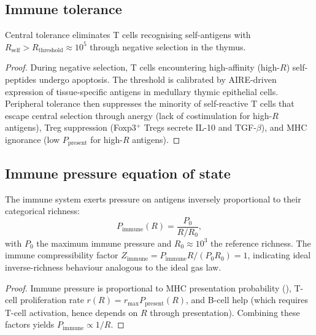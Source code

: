 \subsection{Immune tolerance}

\begin{theorem}
\label{thm:ch07-central-tolerance}
Central tolerance eliminates T cells recognising self-antigens with
$R_{\mathrm{self}} > R_{\mathrm{threshold}} \approx 10^5$ through negative
selection in the thymus.
\end{theorem}

\begin{proof}
During negative selection, T cells encountering high-affinity (high-$R$)
self-peptides undergo apoptosis.  The threshold is calibrated by AIRE-driven
expression of tissue-specific antigens in medullary thymic epithelial cells.
Peripheral tolerance then suppresses the minority of self-reactive T cells
that escape central selection through anergy (lack of costimulation for
high-$R$ antigens), Treg suppression (Foxp3$^+$ Tregs secrete IL-10 and
TGF-$\beta$), and MHC ignorance (low $P_{\mathrm{present}}$ for high-$R$
antigens).
\end{proof}

\subsection{Immune pressure equation of state}

\begin{theorem}
\label{thm:ch07-immune-pressure}
The immune system exerts pressure on antigens inversely proportional to their
categorical richness:
\begin{equation}
  P_{\mathrm{immune}}(R) = \frac{P_0}{R/R_0},
  \label{eq:ch07-immune-pressure}
\end{equation}
with $P_0$ the maximum immune pressure and $R_0 \approx 10^3$ the reference
richness.  The immune compressibility factor
$Z_{\mathrm{immune}} = P_{\mathrm{immune}} R / (P_0 R_0) = 1$, indicating
ideal inverse-richness behaviour analogous to the ideal gas law.
\end{theorem}

\begin{proof}
Immune pressure is proportional to MHC presentation probability
(), T-cell proliferation rate
$r(R) = r_{\max} P_{\mathrm{present}}(R)$, and B-cell help (which requires
T-cell activation, hence depends on $R$ through presentation).  Combining
these factors yields $P_{\mathrm{immune}} \propto 1/R$.
\end{proof}

